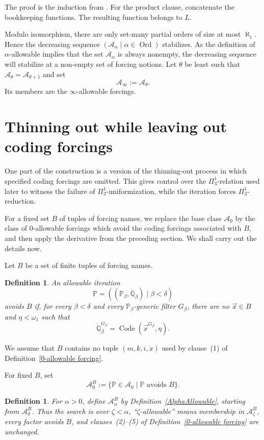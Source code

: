 \documentclass[a4paper,11pt]{article}
\newtheorem{definition}[theorem]{Definition}
\newcommand{\forceP}{\mathbb{P}}
\newcommand{\forceQ}{\mathbb{Q}}
\begin{document}
The proof is the induction from \cite{Reduction}. For the product clause, concatenate the bookkeeping functions. The resulting function belongs to $L$.

Modulo isomorphism, there are only set-many partial orders of size at most $\aleph_1$. Hence the decreasing sequence $(\mathcal A_\alpha\mid\alpha\in\operatorname{Ord})$ stabilizes. As the definition of $\alpha$-allowable implies that the set $\mathcal{A}_{\alpha}$ is always nonempty, the decreasing sequence will stabilize at a non-empty set of forcing notions. Let $\theta$ be least such that $\mathcal A_\theta=\mathcal A_{\theta+1}$ and set
\[
\mathcal A_\infty:=\mathcal A_\theta.
\]
Its members are the $\infty$-allowable forcings.
\section{Thinning out while leaving out coding forcings}

One part of the construction is a version of the thinning-out process in which specified coding forcings are omitted. This gives control over the $\Pi^1_3$-relation used later to witness the failure of $\Pi^1_3$-uniformization, while the iteration forces $\Pi^1_3$-reduction.

For a fixed set $B$ of tuples of forcing names, we replace the base class $\mathcal A_0$ by the class of $0$-allowable forcings which avoid the coding forcings associated with $B$, and then apply the derivative from the preceding section. We shall carry out the details now.

Let $B$ be a set of finite tuples of forcing names.

\begin{definition}\label{AvoidingB}
An allowable iteration
\[
\forceP=((\forceP_\beta,\dot{\forceQ}_\beta)\mid\beta<\delta)
\]
\emph{avoids $B$} if, for every $\beta<\delta$ and every $\forceP_\beta$-generic filter $G_\beta$, there are no $\vec x\in B$ and $\eta<\omega_1$ such that
\[
\dot{\forceQ}_\beta^{G_\beta}=\operatorname{Code}(\vec x^{G_\beta},\eta).
\]
\end{definition}

We assume that $B$ contains no tuple $(m,k,i,\dot x)$ used by clause~(1) of Definition~\ref{0-allowable forcing}.

For fixed $B$, set
\[
\mathcal A^B_0:=\{\forceP\in\mathcal A_0\mid\forceP\text{ avoids }B\}.
\]

\begin{definition}\label{AlphaAllowableAvoidingB}
For $\alpha>0$, define $\mathcal A^B_\alpha$ by Definition~\ref{AlphaAllowable}, starting from $\mathcal A^B_0$. Thus the search is over $\zeta<\alpha$, ``$\zeta$-allowable'' means membership in $\mathcal A^B_\zeta$, every factor avoids $B$, and clauses~(2)--(5) of Definition~\ref{0-allowable forcing} are unchanged.
\end{definition}
\end{document}
